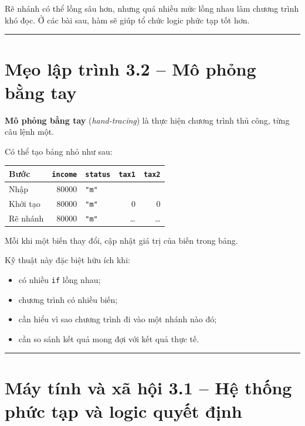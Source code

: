 \documentclass[
  11pt,
  a4paper,
]{article}
\providecommand{\tightlist}{%
  \setlength{\itemsep}{0pt}\setlength{\parskip}{0pt}}
\begin{document}
Rẽ nhánh có thể lồng sâu hơn, nhưng quá nhiều mức lồng nhau làm chương
trình khó đọc. Ở các bài sau, hàm sẽ giúp tổ chức logic phức tạp tốt
hơn.

\begin{center}\rule{0.5\linewidth}{0.5pt}\end{center}

\section{Mẹo lập trình 3.2 -- Mô phỏng bằng
tay}\label{mux1eb9o-lux1eadp-truxecnh-3.2-muxf4-phux1ecfng-bux1eb1ng-tay}

\textbf{Mô phỏng bằng tay} (\emph{hand-tracing}) là thực hiện chương
trình thủ công, từng câu lệnh một.

Có thể tạo bảng nhỏ như sau:

\begin{longtable}[]{@{}lrlrr@{}}
\toprule\noalign{}
Bước & \texttt{income} & \texttt{status} & \texttt{tax1} &
\texttt{tax2} \\
\midrule\noalign{}
\endhead
\bottomrule\noalign{}
\endlastfoot
Nhập & 80000 & \texttt{"m"} & & \\
Khởi tạo & 80000 & \texttt{"m"} & 0 & 0 \\
Rẽ nhánh & 80000 & \texttt{"m"} & \ldots{} & \ldots{} \\
\end{longtable}

Mỗi khi một biến thay đổi, cập nhật giá trị của biến trong bảng.

Kỹ thuật này đặc biệt hữu ích khi:

\begin{itemize}
\tightlist
\item
  có nhiều \texttt{if} lồng nhau;
\item
  chương trình có nhiều biến;
\item
  cần hiểu vì sao chương trình đi vào một nhánh nào đó;
\item
  cần so sánh kết quả mong đợi với kết quả thực tế.
\end{itemize}

\begin{center}\rule{0.5\linewidth}{0.5pt}\end{center}

\section{Máy tính và xã hội 3.1 -- Hệ thống phức tạp và logic quyết
định}\label{muxe1y-tuxednh-vuxe0-xuxe3-hux1ed9i-3.1-hux1ec7-thux1ed1ng-phux1ee9c-tux1ea1p-vuxe0-logic-quyux1ebft-ux111ux1ecbnh}
\end{document}
